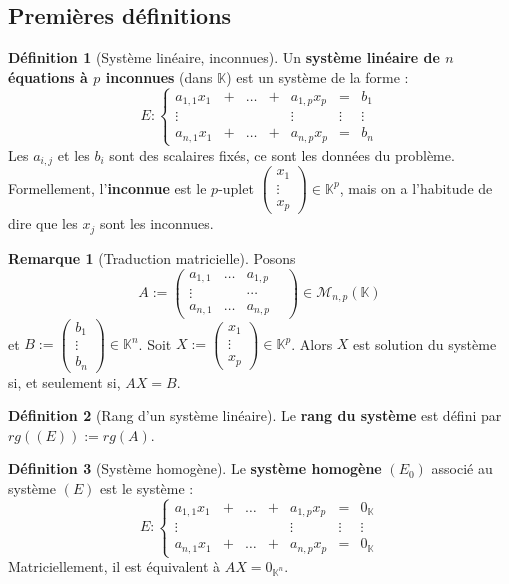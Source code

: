 \documentclass[french]{book}
\newcommand{\K}{\mathbb{K}}
\theoremstyle{plain}
\theoremstyle{definition}
\newtheorem{dfn}{Définition}[chapter]
\newtheorem{rmq}{Remarque}[chapter]
\theoremstyle{remark}
\begin{document}
\subsection{Premières définitions}
\begin{dfn}[Système linéaire, inconnues]
	Un \textbf{système linéaire de $n$ équations à $p$ inconnues} (dans $\K$) est un système de la forme : $$E :\left \{ \begin{array}{ccccccc}
		a_{1,1}x_1&+&\ldots&+&a_{1,p}x_p&=&b_1 \\
		\vdots&&&&\vdots&\vdots&\vdots\\
		a_{n,1}x_1&+&\ldots&+&a_{n,p}x_p&=&b_n
	\end{array}\right.$$ Les $a_{i,j}$ et les $b_i$ sont des scalaires fixés, ce sont les données du problème. Formellement, l'\textbf{inconnue} est le $p$-uplet $\displaystyle\begin{pmatrix}x_1\\ \vdots\\ x_p\end{pmatrix}\in\K^p$, mais on a l'habitude de dire que les $x_j$ sont les inconnues.
\end{dfn}
\begin{rmq}[Traduction matricielle]
	Posons $$A:=\begin{pmatrix}a_{1,1}&\ldots&a_{1,p}\\ \vdots&&\cdots&\\a_{n,1}&\ldots&a_{n,p}\end{pmatrix} \in\mathcal{M}_{n,p}(\K)$$ et $B:=\displaystyle\begin{pmatrix}b_1\\ \vdots\\ b_n\end{pmatrix}\in\K^n$. Soit $X:=\displaystyle\begin{pmatrix}x_1\\ \vdots\\ x_p\end{pmatrix}\in\K^p$. Alors $X$ est solution du système si, et seulement si, $AX=B$.
\end{rmq}
\begin{dfn}[Rang d'un système linéaire]
	Le \textbf{rang du système} est défini par $rg((E)):=rg(A)$.
\end{dfn}
\begin{dfn}[Système homogène]
	Le \textbf{système homogène} $(E_0)$ associé au système $(E)$ est le système : $$E :\left \{ \begin{array}{ccccccc}
		a_{1,1}x_1&+&\ldots&+&a_{1,p}x_p&=&0_\K \\
		\vdots&&&&\vdots&\vdots&\vdots\\
		a_{n,1}x_1&+&\ldots&+&a_{n,p}x_p&=&0_\K
	\end{array}\right.$$ Matriciellement, il est équivalent à $AX=0_{\K^n}$.
\end{dfn}
\end{document}
